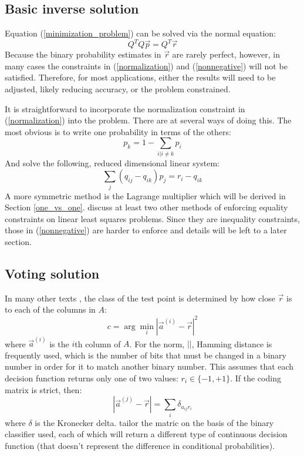 \documentclass{article}
\newenvironment{eqnnon}{\begin{equation*}}{\end{equation*}}
\begin{document}
\subsection{Basic inverse solution}

Equation (\ref{minimization_problem}) can be solved via the normal
equation:
\begin{equation}
	Q^T Q \vec p = Q^T \vec r
	\label{normal_equation}
\end{equation}
Because the binary probability estimates in $\vec r$ are rarely perfect, however,
in many cases the constraints in (\ref{normalization}) and (\ref{nonnegative}) will not be satisfied. 
Therefore, for most applications, either the results will need to be adjusted, likely reducing accuracy, or the problem constrained.

It is straightforward to incorporate the normalization constraint in (\ref{normalization}) into the problem. 
There are at several ways of doing this. The most
obvious is to write one probability in terms of the others:
\begin{equation}
	p_k = 1 - \sum_{i|i \ne k} p_i
	\label{reduce_dimension1}
\end{equation}
And solve the following, reduced dimensional linear system:
\begin{equation}
	\sum_j (q_{ij} - q_{ik} ) p_j = r_i - q_{ik}
	\label{reduce_dimension2}
\end{equation}
A more symmetric method is the Lagrange multiplier which will be
derived in Section \ref{one_vs_one}.
\citet{Lawson_Hanson1995} discuss at least two other methods of
enforcing equality constraints on linear least squares problems.
Since they are inequality constraints, those in (\ref{nonnegative}) are
harder to enforce and details  will be left to a later section.

\subsection{Voting solution}

In many other texts \citep{Allwein_etal2000, Hsu_Lin2002, Dietterich_Bakiri1995},
the class of the test point is determined by how close $\vec r$
is to each of the columns in $A$:
\begin{eqnnon}
	c = \arg \min_i |\vec a^{(i)} - \vec r|^2
\end{eqnnon}
where $\vec a^{(i)}$ is the $i$th column of $A$.
For the norm, $||$, Hamming distance is
frequently used, which is the number of bits that must be changed
in a binary number in order for it to match another binary number.
This assumes that each decision function returns only one of two values: 
$r_i \in \lbrace -1, +1 \rbrace$.
If the coding matrix is strict, then:
\begin{eqnnon}
	|\vec a^{(j)} - \vec r| = \sum_i \delta_{a_{ij} r_i}
\end{eqnnon}
where $\delta$ is the Kronecker delta.
\citet{Allwein_etal2000} 
tailor the matric on the basis of the binary classifier used, each of which
will return a different type of continuous decision function 
(that doesn't represent the difference in conditional probabilities).
\end{document}
